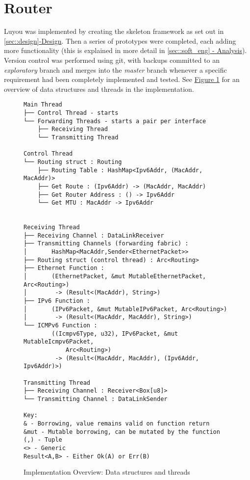 \documentclass[12pt,a4paper,twoside,openany]{report}
\begin{document}
\pagebreak

\section{Router}
\label{sec::router}

Luyou was implemented by creating the skeleton framework as set out in \ref{sec::design}\hyperref[sec::design]{-Design}.  Then a series of prototypes were completed, each adding more functionality (this is explained in more detail in \ref{sec::soft_eng}\hyperref[sec::soft_eng]{ - Analysis}).  Version control was performed using git\cite{git}, with backups committed to an \textit{exploratory} branch and merges into the \textit{master} branch whenever a specific requirement had been completely implemented and tested.  See \hyperref[fig::implementation_overview]{Figure }\ref{fig::implementation_overview} for an overview of data structures and threads in the implementation.

\begin{figure}
\begin{lstlisting}[style=tree]
Main Thread
├── Control Thread - starts
└── Forwarding Threads - starts a pair per interface
    ├── Receiving Thread 
    └── Transmitting Thread

Control Thread
└── Routing struct : Routing
    ├── Routing Table : HashMap<Ipv6Addr, (MacAddr, MacAddr)>
    ├── Get Route : (Ipv6Addr) -> (MacAddr, MacAddr)
    ├── Get Router Address : () -> Ipv6Addr
    └── Get MTU : MacAddr -> Ipv6Addr
    

Receiving Thread
├── Receiving Channel : DataLinkReceiver
├── Transmitting Channels (forwarding fabric) : 
│       HashMap<MacAddr,Sender<EthernetPacket>>
├── Routing struct (control thread) : Arc<Routing>
├── Ethernet Function : 
│       (EthernetPacket, &mut MutableEthernetPacket, Arc<Routing>)
│        -> (Result<(MacAddr), String>)
├── IPv6 Function :
│       (IPv6Packet, &mut MutableIPv6Packet, Arc<Routing>)
│        -> (Result<(MacAddr, MacAddr), String>)
└── ICMPv6 Function :
        ((Icmpv6Type, u32), IPv6Packet, &mut MutableIcmpv6Packet, 
            Arc<Routing>) 
         -> (Result<(MacAddr, MacAddr), (Ipv6Addr, Ipv6Addr)>)

Transmitting Thread
├── Receiving Channel : Receiver<Box[u8]>
└── Transmitting Channel : DataLinkSender

Key:
& - Borrowing, value remains valid on function return
&mut - Mutable borrowing, can be mutated by the function
(,) - Tuple
<> - Generic
Result<A,B> - Either Ok(A) or Err(B)
\end{lstlisting}
\caption{Implementation Overview: Data structures and threads}
\label{fig::implementation_overview}
\end{figure}
\end{document}
